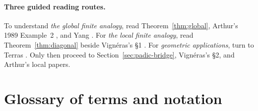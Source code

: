 \documentclass[12pt]{article}
\theoremstyle{remark}
\begin{document}
\paragraph{Three guided reading routes.}
To understand \emph{the global finite analogy}, read
Theorem~\ref{thm:global}, Arthur's 1989 Example~2
\cite{ArthurHecke1989}, and Yang \cite{Yang2006}.
For \emph{the local finite analogy}, read
Theorem~\ref{thm:diagonal} beside Vign\'eras's \S1
\cite{Vigneras1991}. For \emph{geometric applications},
turn to Terras \cite[Chs.~22--24]{Terras1999}.
Only then proceed to Section~\ref{sec:padic-bridge},
Vign\'eras's \S2, and Arthur's local papers.

\section{Glossary of terms and notation}
\label{sec:glossary}
\end{document}
